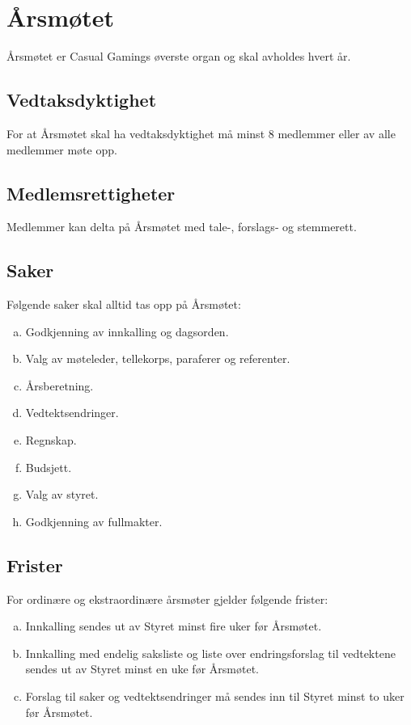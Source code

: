 \chapter{Årsmøtet}
Årsmøtet er Casual Gamings øverste organ og skal avholdes hvert år.

\section{Vedtaksdyktighet}
For at Årsmøtet skal ha vedtaksdyktighet må minst 8 medlemmer eller  av alle medlemmer møte opp.

\section{Medlemsrettigheter}
Medlemmer kan delta på Årsmøtet med tale-, forslags‐ og stemmerett.

\section{Saker}
Følgende saker skal alltid tas opp på Årsmøtet:
\begin{enumerate}[a.]
    \item Godkjenning av innkalling og dagsorden.
    \item Valg av møteleder, tellekorps, paraferer og referenter.
    \item Årsberetning.
    \item Vedtektsendringer.
    \item Regnskap.
    \item Budsjett.
    \item Valg av styret.
    \item Godkjenning av fullmakter.
\end{enumerate}

\section{Frister}
For ordinære og ekstraordinære årsmøter gjelder følgende frister:
\begin{enumerate}[a.]
    \item Innkalling sendes ut av Styret minst fire uker før Årsmøtet.
    \item Innkalling med endelig saksliste og liste over endringsforslag til vedtektene sendes ut av Styret minst en uke før Årsmøtet.
    \item Forslag til saker og vedtektsendringer må sendes inn til Styret minst to uker før Årsmøtet.
\end{enumerate}

